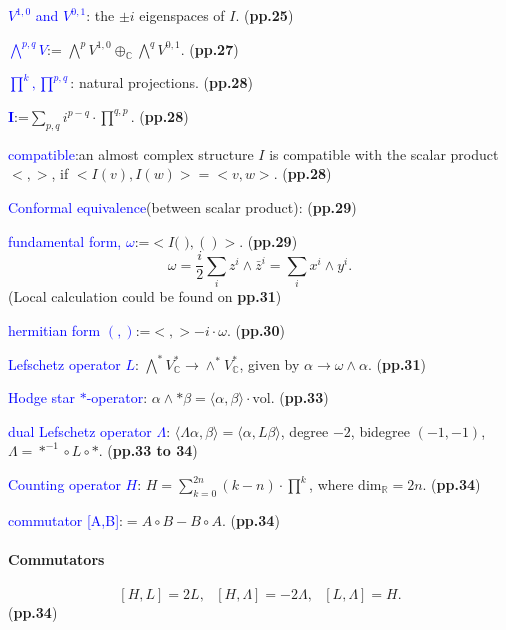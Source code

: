 \documentclass{book}
\numberwithin{equation}{subsection} %
\theoremstyle{definition}
\begin{document}
    \textcolor{blue}{$V^{1,0}$ and $V^{0,1}$}: the $\pm i$ eigenspaces 
    of $I$.
    (\textbf{pp.25})

    \textcolor{blue}{$\bigwedge^{p,q} V$}:=
    $\bigwedge^p V^{1,0}\oplus_{\mathbb{C}}\bigwedge^q V^{0,1}$.
    (\textbf{pp.27})

    \textcolor{blue}{$\prod^k,\prod^{p,q}$}: natural projections.
    (\textbf{pp.28})
    
    \textcolor{blue}{$\mathbf{I}$}:=$\sum_{p,q}i^{p-q}\cdot\prod^{q,p}$.
    (\textbf{pp.28})

    \textcolor{blue}{compatible}:an almost complex structure $I$ is
    compatible with the scalar product $<,>$, if $<I(v),I(w)>=<v,w>$.
    (\textbf{pp.28})

    \textcolor{blue}{Conformal equivalence}(between scalar product):
    (\textbf{pp.29})

    \textcolor{blue}{fundamental form, $\omega$}:=$<I\text{( )},()>.$
    (\textbf{pp.29})
    $$\omega=\frac{i}{2}\sum_i z^i\wedge\bar{z}^i=\sum_i x^i\wedge y^i.$$
    \quad(Local calculation could be found on \textbf{pp.31})

    \textcolor{blue}{hermitian form $(,)$}:=$<,>-i\cdot\omega$.
    (\textbf{pp.30})

    \textcolor{blue}{Lefschetz operator $L$}:
        $\bigwedge^* V^*_{\mathbb{C}}\to
    \wedge^* V_{\mathbb{C}}^*$, given by $\alpha\to\omega\wedge\alpha$.
    (\textbf{pp.31})

    \textcolor{blue}{Hodge star $*$-operator}: $\alpha\wedge *\beta=
        \langle\alpha,\beta\rangle \cdot \text{vol}$.
    (\textbf{pp.33})

    \textcolor{blue}{dual Lefschetz operator $\Lambda$}:
        $\langle\Lambda\alpha,\beta\rangle =\langle\alpha,L\beta\rangle$,
        degree $-2$, bidegree $(-1,-1)$, $\Lambda=*^{-1}\circ L\circ *$.
    (\textbf{pp.33 to 34})

    \textcolor{blue}{Counting operator $H$}:
        $H=\sum_{k=0}^{2n}(k-n)\cdot\prod^k$, 
        where $\text{dim}_{\mathbb{R}}=2n$.
    (\textbf{pp.34})

    \textcolor{blue}{commutator [A,B]}:$=A\circ B-B\circ A$.
    (\textbf{pp.34})


\paragraph{Commutators}
$$[H,L]=2L,\text{ } [H,\Lambda]=-2\Lambda,\text{ } [L,\Lambda]=H.$$
(\textbf{pp.34})
\end{document}
